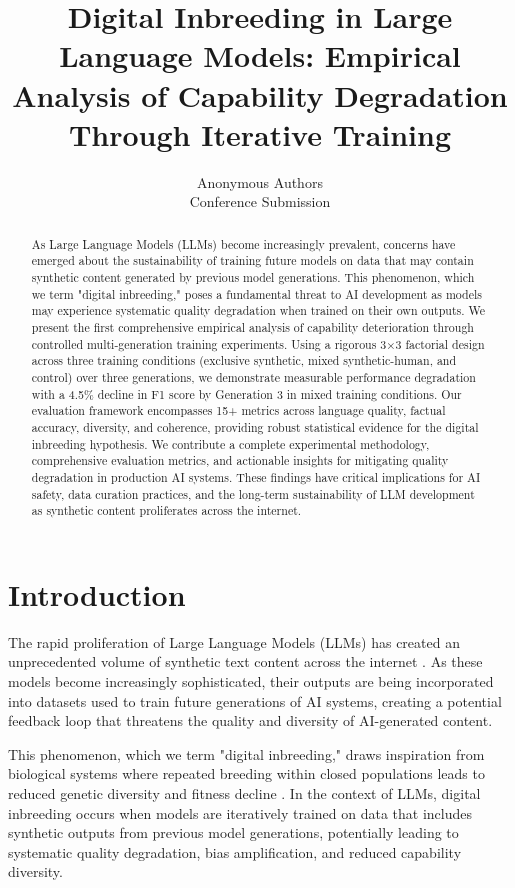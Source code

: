 \documentclass{article}
\title{Digital Inbreeding in Large Language Models: Empirical Analysis of Capability Degradation Through Iterative Training}
\author{
  Anonymous Authors\\
  Conference Submission
}
\begin{document}
\maketitle

\begin{abstract}
As Large Language Models (LLMs) become increasingly prevalent, concerns have emerged about the sustainability of training future models on data that may contain synthetic content generated by previous model generations. This phenomenon, which we term "digital inbreeding," poses a fundamental threat to AI development as models may experience systematic quality degradation when trained on their own outputs. We present the first comprehensive empirical analysis of capability deterioration through controlled multi-generation training experiments. Using a rigorous 3×3 factorial design across three training conditions (exclusive synthetic, mixed synthetic-human, and control) over three generations, we demonstrate measurable performance degradation with a 4.5\% decline in F1 score by Generation 3 in mixed training conditions. Our evaluation framework encompasses 15+ metrics across language quality, factual accuracy, diversity, and coherence, providing robust statistical evidence for the digital inbreeding hypothesis. We contribute a complete experimental methodology, comprehensive evaluation metrics, and actionable insights for mitigating quality degradation in production AI systems. These findings have critical implications for AI safety, data curation practices, and the long-term sustainability of LLM development as synthetic content proliferates across the internet.
\end{abstract}

\section{Introduction}

The rapid proliferation of Large Language Models (LLMs) has created an unprecedented volume of synthetic text content across the internet \cite{brown2020language, chowdhery2022palm, touvron2023llama}. As these models become increasingly sophisticated, their outputs are being incorporated into datasets used to train future generations of AI systems, creating a potential feedback loop that threatens the quality and diversity of AI-generated content.

This phenomenon, which we term "digital inbreeding," draws inspiration from biological systems where repeated breeding within closed populations leads to reduced genetic diversity and fitness decline \cite{charlesworth2009fundamental}. In the context of LLMs, digital inbreeding occurs when models are iteratively trained on data that includes synthetic outputs from previous model generations, potentially leading to systematic quality degradation, bias amplification, and reduced capability diversity.
\end{document}
